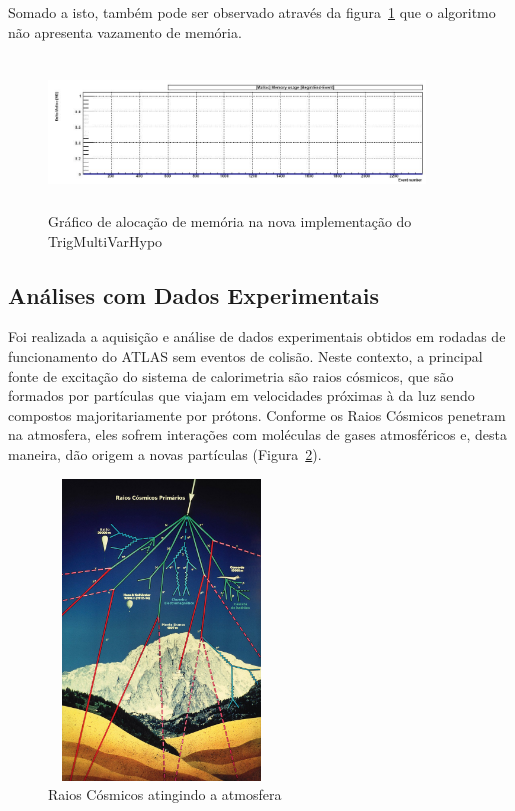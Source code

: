 \documentclass[a4paper,10pt,titlepage]{article}
\begin{document}
Somado a isto, também pode ser observado através da figura~\ref{fig:new_tmvh_maloc} que o algoritmo não apresenta vazamento de memória.

\begin{figure}[htbp!]
 \centering
 \includegraphics[width=10cm,height=4cm]{Figs/tmvh_refactoring/new_tmvh_maloc.jpeg}
 \caption{Gráfico de alocação de memória na nova implementação do TrigMultiVarHypo}
 \label{fig:new_tmvh_maloc}
\end{figure}

\subsection{Análises com Dados Experimentais}

Foi realizada a aquisição e análise de dados experimentais obtidos em rodadas de funcionamento do ATLAS sem eventos de colisão. Neste contexto, a principal fonte de excitação do sistema de calorimetria são raios cósmicos, que são formados por partículas que viajam em velocidades próximas à da luz sendo compostos majoritariamente por prótons.
Conforme os Raios Cósmicos penetram na atmosfera, eles sofrem interações com moléculas de gases atmosféricos e, desta maneira, dão origem a novas partículas (Figura~\ref{fig:rc_sky}). 

\begin{figure}[htbp!]
 \centering
 \includegraphics[width=6cm,height=8cm]{Figs/cosmics/rc_sky.png}
 \caption{Raios Cósmicos atingindo a atmosfera}
 \label{fig:rc_sky}
\end{figure}
\end{document}
